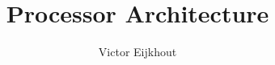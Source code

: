 \documentclass[11pt,headernav]{beamer}
\begin{document}
\title{Processor Architecture}
\author{Victor Eijkhout}
\date{\hpcsemester}

\begin{frame}
  \titlepage
\end{frame}


\end{document}

